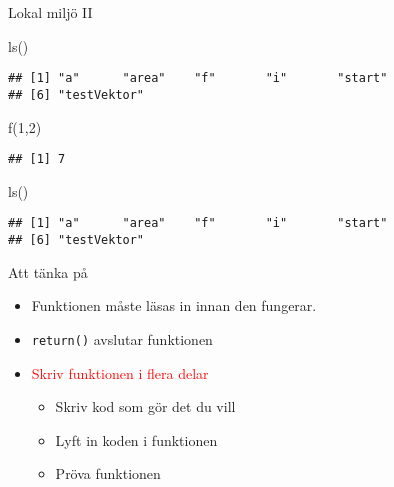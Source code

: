 \documentclass[
  10pt,
  ignorenonframetext,
]{beamer}
\newenvironment{Shaded}{\begin{snugshade}}{\end{snugshade}}
\newcommand{\DecValTok}[1]{\textcolor[rgb]{0.00,0.00,0.81}{#1}}
\newcommand{\FunctionTok}[1]{\textcolor[rgb]{0.00,0.00,0.00}{#1}}
\newcommand{\NormalTok}[1]{#1}
\providecommand{\tightlist}{%
  \setlength{\itemsep}{0pt}\setlength{\parskip}{0pt}}
\begin{document}

\begin{frame}[fragile]{Lokal miljö II}
\protect\hypertarget{lokal-miljuxf6-ii}{}
\begin{Shaded}
\begin{Highlighting}[]
\FunctionTok{ls}\NormalTok{()}
\end{Highlighting}
\end{Shaded}

\begin{verbatim}
## [1] "a"      "area"    "f"       "i"       "start"     
## [6] "testVektor"
\end{verbatim}

\begin{Shaded}
\begin{Highlighting}[]
\FunctionTok{f}\NormalTok{(}\DecValTok{1}\NormalTok{,}\DecValTok{2}\NormalTok{)}
\end{Highlighting}
\end{Shaded}

\begin{verbatim}
## [1] 7
\end{verbatim}

\begin{Shaded}
\begin{Highlighting}[]
\FunctionTok{ls}\NormalTok{()}
\end{Highlighting}
\end{Shaded}

\begin{verbatim}
## [1] "a"      "area"    "f"       "i"       "start"     
## [6] "testVektor"
\end{verbatim}
\end{frame}



\begin{frame}{Att tänka på}
\protect\hypertarget{att-tuxe4nka-puxe5}{}
\begin{itemize}
\tightlist
\item
  Funktionen måste läsas in innan den fungerar.
\item
  \texttt{return()} avslutar funktionen
\item
  \textcolor{red}{Skriv funktionen i flera delar}

  \begin{itemize}
  \tightlist
  \item
    Skriv kod som gör det du vill
  \item
    Lyft in koden i funktionen
  \item
    Pröva funktionen
  \end{itemize}
\end{itemize}
\end{frame}
\end{document}
